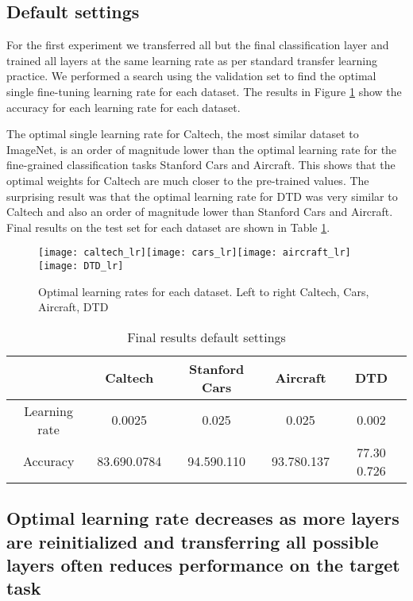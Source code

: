 \documentclass[]{article}
\begin{document}
\subsection{Default settings}

For the first experiment we transferred all but the final classification
layer and trained all layers at the same learning rate as per standard
transfer learning practice. We performed a search using the validation
set to find the optimal single fine-tuning learning rate for each
dataset. The results in Figure \ref{single learning rates} show the accuracy for each learning rate for each dataset.

The optimal single learning rate for Caltech, the most similar dataset
to ImageNet, is an order of magnitude lower than the optimal learning
rate for the fine-grained classification tasks Stanford Cars and Aircraft.
This shows that the optimal weights for Caltech are much closer to
the pre-trained values. The surprising result was that the optimal
learning rate for DTD was very similar to Caltech and also an order
of magnitude lower than Stanford Cars and Aircraft. Final results on the test set for each dataset are shown in Table
\ref{final default}.

\begin{figure}[th]

\begin{centering}
\texttt{[image: caltech\_lr]}\texttt{[image: cars\_lr]}\texttt{[image: aircraft\_lr]}\texttt{[image: DTD\_lr]}
\caption{Optimal learning rates for each dataset. Left to right Caltech, Cars, Aircraft, DTD}
\label{single learning rates}
\par\end{centering}
\end{figure}


\begin{table}[th]

\caption{Final results default settings}
\label{final default}
\centering
\begin{tabular}{ccccc}
\hline 
\centering
 & Caltech & Stanford Cars & Aircraft & DTD\tabularnewline
\hline 
Learning rate & 0.0025  & 0.025 & 0.025 & 0.002 \tabularnewline
Accuracy & 83.690.0784 & 94.590.110 & 93.780.137 & 77.30 0.726\tabularnewline
\hline 
\end{tabular}
\end{table}

\subsection{Optimal learning rate decreases as more layers are reinitialized
and transferring all possible layers often reduces performance on
the target task}
\end{document}
